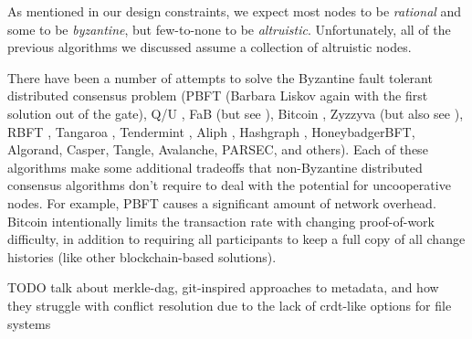 \documentclass[11pt,fleqn,openany]{book}
\newcommand{\todo}[1]{{\color{red} TODO #1 }}
\begin{document}
As mentioned in our design constraints, we expect most nodes to be {\em
rational} and some to be {\em byzantine}, but few-to-none to be {\em
altruistic}. Unfortunately, all of the previous algorithms we discussed assume a
collection of altruistic nodes.

There have been a number of attempts to solve the Byzantine fault tolerant
distributed consensus problem
(PBFT \cite{pbft} (Barbara Liskov again with the
first solution out of the gate), Q/U \cite{qu}, FaB \cite{fab} (but see
\cite{fab-revisited}), Bitcoin \cite{bitcoin}, Zyzzyva \cite{zyzzyva} (but also
see \cite{fab-revisited}), RBFT \cite{rbft}, Tangaroa \cite{tangaroa},
Tendermint \cite{tendermint}, Aliph \cite{aliph}, Hashgraph \cite{hashgraph},
HoneybadgerBFT\cite{honeybadger}, Algorand\cite{algorand}, Casper\cite{casper},
Tangle\cite{tangle}, Avalanche\cite{avalanche}, PARSEC\cite{parsec}, and
others\cite{mickens-bft}).
Each of these algorithms make some
additional tradeoffs that non-Byzantine distributed consensus algorithms don't
require to deal with the potential for uncooperative nodes. For example,
PBFT \cite{pbft} causes a significant amount of network overhead. Bitcoin
\cite{bitcoin} intentionally limits the transaction rate with changing
proof-of-work difficulty, in addition to requiring all participants to keep a
full copy of all change histories (like other blockchain-based
solutions).

\todo{talk about merkle-dag, git-inspired approaches to metadata, and how
they struggle with conflict resolution due to the lack of crdt-like options for
file systems}

\newpage

\begingroup
\raggedright

\endgroup
\end{document}
